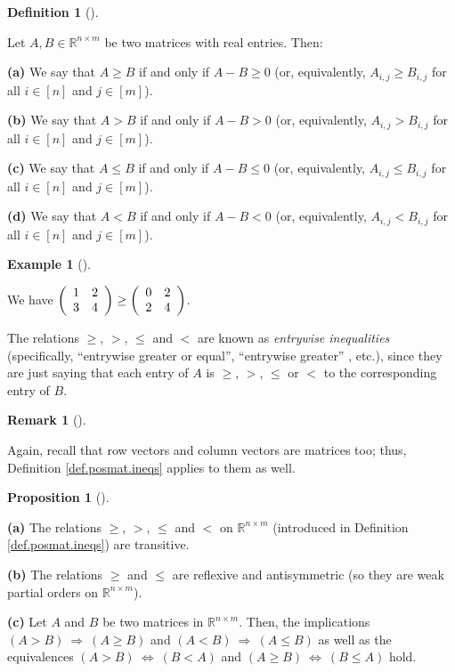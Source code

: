 \documentclass[numbers=enddot,12pt,final,onecolumn,notitlepage]{scrartcl}%
\numberwithin{exer}{subsection}
\theoremstyle{definition}
\newtheorem{prop}[theo]{Proposition}
\newenvironment{proposition}[1][]
{\begin{prop}[#1]\begin{leftbar}}
{\end{leftbar}\end{prop}}
\newtheorem{defi}[theo]{Definition}
\newenvironment{definition}[1][]
{\begin{defi}[#1]\begin{leftbar}}
{\end{leftbar}\end{defi}}
\newtheorem{remk}[theo]{Remark}
\newenvironment{remark}[1][]
{\begin{remk}[#1]\begin{leftbar}}
{\end{leftbar}\end{remk}}
\newtheorem{exam}[theo]{Example}
\newenvironment{example}[1][]
{\begin{exam}[#1]\begin{leftbar}}
{\end{leftbar}\end{exam}}
\begin{document}
\begin{definition}
\label{def.posmat.ineqs}Let $A,B\in\mathbb{R}^{n\times m}$ be two matrices
with real entries. Then: \medskip

\textbf{(a)} We say that $A\geq B$ if and only if $A-B\geq0$ (or,
equivalently, $A_{i,j}\geq B_{i,j}$ for all $i\in\left[  n\right]  $ and
$j\in\left[  m\right]  $). \medskip

\textbf{(b)} We say that $A>B$ if and only if $A-B>0$ (or, equivalently,
$A_{i,j}>B_{i,j}$ for all $i\in\left[  n\right]  $ and $j\in\left[  m\right]
$). \medskip

\textbf{(c)} We say that $A\leq B$ if and only if $A-B\leq0$ (or,
equivalently, $A_{i,j}\leq B_{i,j}$ for all $i\in\left[  n\right]  $ and
$j\in\left[  m\right]  $). \medskip

\textbf{(d)} We say that $A<B$ if and only if $A-B<0$ (or, equivalently,
$A_{i,j}<B_{i,j}$ for all $i\in\left[  n\right]  $ and $j\in\left[  m\right]
$).
\end{definition}

\begin{example}
We have $\left(
\begin{array}
[c]{cc}%
1 & 2\\
3 & 4
\end{array}
\right)  \geq\left(
\begin{array}
[c]{cc}%
0 & 2\\
2 & 4
\end{array}
\right)  $.
\end{example}

The relations $\geq$, $>$, $\leq$ and $<$ are known as \emph{entrywise
inequalities} (specifically, \textquotedblleft entrywise greater or
equal\textquotedblright, \textquotedblleft entrywise greater\textquotedblright%
, etc.), since they are just saying that each entry of $A$ is $\geq$, $>$,
$\leq$ or $<$ to the corresponding entry of $B$.

\begin{remark}
Again, recall that row vectors and column vectors are matrices too; thus,
Definition \ref{def.posmat.ineqs} applies to them as well.
\end{remark}

\begin{proposition}
\textbf{(a)} The relations $\geq$, $>$, $\leq$ and $<$ on $\mathbb{R}^{n\times
m}$ (introduced in Definition \ref{def.posmat.ineqs}) are transitive.  \medskip

\textbf{(b)} The relations $\geq$ and $\leq$ are reflexive and antisymmetric
(so they are weak partial orders on $\mathbb{R}^{n\times m}$). \medskip

\textbf{(c)} Let $A$ and $B$ be two matrices in $\mathbb{R}^{n\times m}$.
Then, the implications $\left(  A>B\right)  \ \Longrightarrow\ \left(  A\geq
B\right)  $ and $\left(  A<B\right)  \ \Longrightarrow\ \left(  A\leq
B\right)  $ as well as the equivalences $\left(  A>B\right)
\ \Longleftrightarrow\ \left(  B<A\right)  $ and $\left(  A\geq B\right)
\ \Longleftrightarrow\ \left(  B\leq A\right)  $ hold.
\end{proposition}
\end{document}
